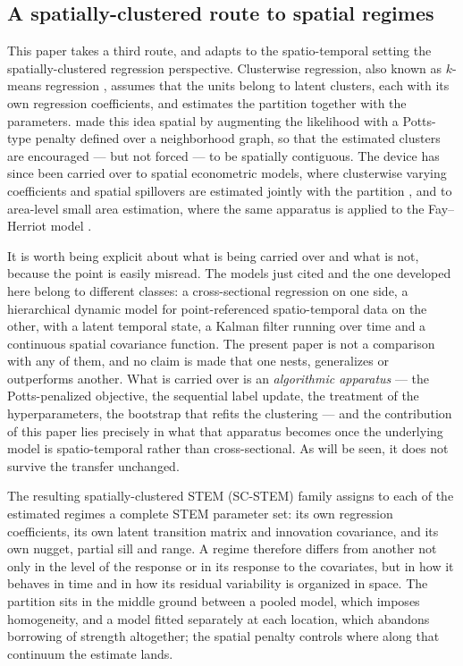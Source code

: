 \subsection{A spatially-clustered route to spatial regimes}\label{sec1:route}

This paper takes a third route, and adapts to the spatio-temporal setting the spatially-clustered regression perspective. Clusterwise regression, also known as $k$-means regression \citep{desarbo1988maximum,spath1979algorithmus}, assumes that the units belong to latent clusters, each with its own regression coefficients, and estimates the partition together with the parameters. \citet{SugasawaMurakami2021} made this idea spatial by augmenting the likelihood with a Potts-type penalty \citep{potts1952some} defined over a neighborhood graph, so that the estimated clusters are encouraged --- but not forced --- to be spatially contiguous. The device has since been carried over to spatial econometric models, where clusterwise varying coefficients and spatial spillovers are estimated jointly with the partition \citep{CerquetiEtAl2025_JABES,MaranzanoEtAl2025}, and to area-level small area estimation, where the same apparatus is applied to the Fay--Herriot model \citep{MaranzanoMatteraSugasawa2026}.

It is worth being explicit about what is being carried over and what is not, because the point is easily misread. The models just cited and the one developed here belong to different classes: a cross-sectional regression on one side, a hierarchical dynamic model for point-referenced spatio-temporal data on the other, with a latent temporal state, a Kalman filter running over time and a continuous spatial covariance function. The present paper is not a comparison with any of them, and no claim is made that one nests, generalizes or outperforms another. What is carried over is an \emph{algorithmic apparatus} --- the Potts-penalized objective, the sequential label update, the treatment of the hyperparameters, the bootstrap that refits the clustering --- and the contribution of this paper lies precisely in what that apparatus becomes once the underlying model is spatio-temporal rather than cross-sectional. As will be seen, it does not survive the transfer unchanged.

The resulting spatially-clustered STEM (SC-STEM) family assigns to each of the estimated regimes a complete STEM parameter set: its own regression coefficients, its own latent transition matrix and innovation covariance, and its own nugget, partial sill and range. A regime therefore differs from another not only in the level of the response or in its response to the covariates, but in how it behaves in time and in how its residual variability is organized in space. The partition sits in the middle ground between a pooled model, which imposes homogeneity, and a model fitted separately at each location, which abandons borrowing of strength altogether; the spatial penalty controls where along that continuum the estimate lands.

